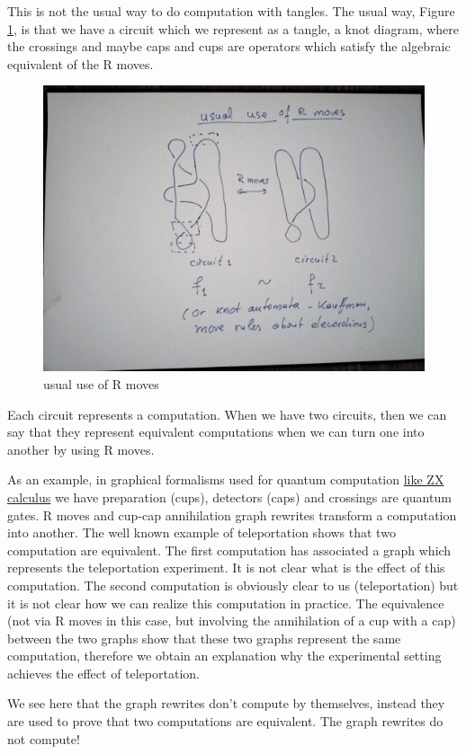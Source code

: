 \documentclass[]{article}
\begin{document}
This is not the usual way to do computation with tangles. The usual way, Figure \ref{usual-use-of-R-moves}, 
is that we have a circuit which we represent as a tangle, a knot
diagram, where the crossings and maybe caps and cups are operators which
satisfy the algebraic equivalent of the R moves.

\begin{figure}[h!]
\centering
\includegraphics[width=0.75\linewidth]{img/2818.jpg}
\caption{usual use of R moves}
\label{usual-use-of-R-moves}
\end{figure}

Each circuit represents a computation. When we have two circuits, then
we can say that they represent equivalent computations when we can turn
one into another by using R moves.

As an example, in graphical formalisms used for quantum computation
\href{https://arxiv.org/pdf/0906.4725.pdf}{like ZX calculus} \cite{zx} we have
preparation (cups), detectors (caps) and crossings are quantum gates. R
moves and cup-cap annihilation graph rewrites transform a computation
into another. The well known example of teleportation shows that two
computation are equivalent. The first computation has associated a graph
which represents the teleportation experiment. It is not clear what is
the effect of this computation. The second computation is obviously
clear to us (teleportation) but it is not clear how we can realize this
computation in practice. The equivalence (not via R moves in this case,
but involving the annihilation of a cup with a cap) between the two
graphs show that these two graphs represent the same computation,
therefore we obtain an explanation why the experimental setting achieves
the effect of teleportation.

We see here that the graph rewrites don't compute by themselves, instead
they are used to prove that two computations are equivalent. The graph
rewrites do not compute!
\end{document}
